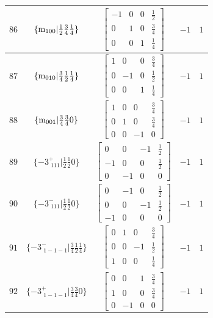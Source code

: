 \documentclass[fleqn,8pt]{jsarticle}
\begin{document}
\begin{longtable}{ccccc}
$ 86 $ & $ \{{\rm m}_{100}|\frac{1}{2} \frac{3}{4} \frac{1}{4}\} $ & $ \begin{bmatrix} -1 & 0 & 0 & \frac{1}{2} \\ 0 & 1 & 0 & \frac{3}{4} \\ 0 & 0 & 1 & \frac{1}{4} \end{bmatrix} $ & $ -1 $ & $ 1 $ \\ \hline
$ 87 $ & $ \{{\rm m}_{010}|\frac{3}{4} \frac{1}{2} \frac{1}{4}\} $ & $ \begin{bmatrix} 1 & 0 & 0 & \frac{3}{4} \\ 0 & -1 & 0 & \frac{1}{2} \\ 0 & 0 & 1 & \frac{1}{4} \end{bmatrix} $ & $ -1 $ & $ 1 $ \\ \hline
$ 88 $ & $ \{{\rm m}_{001}|\frac{3}{4} \frac{3}{4} 0\} $ & $ \begin{bmatrix} 1 & 0 & 0 & \frac{3}{4} \\ 0 & 1 & 0 & \frac{3}{4} \\ 0 & 0 & -1 & 0 \end{bmatrix} $ & $ -1 $ & $ 1 $ \\ \hline
$ 89 $ & $ \{-3^{+}_{\,\,111}|\frac{1}{2} \frac{1}{2} 0\} $ & $ \begin{bmatrix} 0 & 0 & -1 & \frac{1}{2} \\ -1 & 0 & 0 & \frac{1}{2} \\ 0 & -1 & 0 & 0 \end{bmatrix} $ & $ -1 $ & $ 1 $ \\ \hline
$ 90 $ & $ \{-3^{-}_{\,\,111}|\frac{1}{2} \frac{1}{2} 0\} $ & $ \begin{bmatrix} 0 & -1 & 0 & \frac{1}{2} \\ 0 & 0 & -1 & \frac{1}{2} \\ -1 & 0 & 0 & 0 \end{bmatrix} $ & $ -1 $ & $ 1 $ \\ \hline
$ 91 $ & $ \{-3^{-}_{\,\,1-1-1}|\frac{3}{4} \frac{1}{2} \frac{1}{4}\} $ & $ \begin{bmatrix} 0 & 1 & 0 & \frac{3}{4} \\ 0 & 0 & -1 & \frac{1}{2} \\ 1 & 0 & 0 & \frac{1}{4} \end{bmatrix} $ & $ -1 $ & $ 1 $ \\ \hline
$ 92 $ & $ \{-3^{+}_{\,\,1-1-1}|\frac{3}{4} \frac{3}{4} 0\} $ & $ \begin{bmatrix} 0 & 0 & 1 & \frac{3}{4} \\ 1 & 0 & 0 & \frac{3}{4} \\ 0 & -1 & 0 & 0 \end{bmatrix} $ & $ -1 $ & $ 1 $ \\ \hline

\end{longtable}
\end{document}
